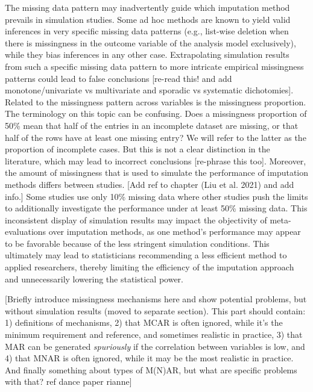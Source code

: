 \documentclass[
]{article}
\begin{document}
The missing data pattern may inadvertently guide which imputation method
prevails in simulation studies. Some ad hoc methods are known to yield
valid inferences in very specific missing data patterns (e.g., list-wise
deletion when there is missingness in the outcome variable of the
analysis model exclusively), while they bias inferences in any other
case. Extrapolating simulation results from such a specific missing data
pattern to more intricate empirical missingness patterns could lead to
false conclusions {[}re-read this! and add monotone/univariate vs
multivariate and sporadic vs systematic dichotomies{]}. Related to the
missingness pattern across variables is the missingness proportion. The
terminology on this topic can be confusing. Does a missingness
proportion of 50\% mean that half of the entries in an incomplete
dataset are missing, or that half of the rows have at least one missing
entry? We will refer to the latter as the proportion of incomplete
cases. But this is not a clear distinction in the literature, which may
lead to incorrect conclusions {[}re-phrase this too{]}. Moreover, the
amount of missingness that is used to simulate the performance of
imputation methods differs between studies. {[}Add ref to chapter (Liu
et al. 2021) and add info.{]} Some studies use only 10\% missing data
where other studies push the limits to additionally investigate the
performance under at least 50\% missing data. This inconsistent display
of simulation results may impact the objectivity of meta-evaluations
over imputation methods, as one method's performance may appear to be
favorable because of the less stringent simulation conditions. This
ultimately may lead to statisticians recommending a less efficient
method to applied researchers, thereby limiting the efficiency of the
imputation approach and unnecessarily lowering the statistical power.

{[}Briefly introduce missingness mechanisms here and show potential
problems, but without simulation results (moved to separate section).
This part should contain: 1) definitions of mechanisms, 2) that MCAR is
often ignored, while it's the minimum requirement and reference, and
sometimes realistic in practice, 3) that MAR can be generated
\emph{spuriously} if the correlation between variables is low, and 4)
that MNAR is often ignored, while it may be the most realistic in
practice. And finally something about types of M(N)AR, but what are
specific problems with that? ref dance paper rianne{]}

\hypertarget{section}{%
\section{}\label{section}}
\end{document}
